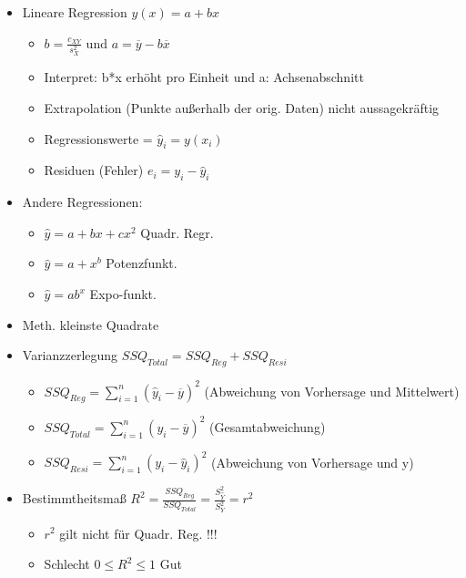 \documentclass[a4paper]{article}
\begin{document}
\begin{landscape}
\begin{multicols}{4}
    \begin{itemize}[noitemsep,nolistsep,leftmargin=*]
        \item Lineare Regression $y(x) = a +bx$
        \begin{itemize}[noitemsep,nolistsep,leftmargin=*]
            \item $b = \frac{c_{XY}}{s_X^2}$ und $a = \overline{y} - b\overline{x}$
            \item Interpret: b*x erhöht pro Einheit und a: Achsenabschnitt
            \item Extrapolation (Punkte außerhalb der orig. Daten) nicht aussagekräftig
            \item Regressionswerte = $\widehat{y}_i = y(x_i)$
            \item Residuen (Fehler) $e_i = y_i - \widehat{y}_i$
        \end{itemize}
        \item Andere Regressionen:
        \begin{itemize}[noitemsep,nolistsep,leftmargin=*]
            \item $\hat{y} =  a+bx+cx^2$ Quadr. Regr.
            \item $\hat{y} =  a+x^b$ Potenzfunkt.
            \item $\hat{y} =  ab^x$ Expo-funkt.
        \end{itemize}
        \item Meth. kleinste Quadrate
        \item Varianzzerlegung $SSQ_{Total} = SSQ_{Reg} + SSQ_{Resi}$
        \begin{itemize}[noitemsep,nolistsep,leftmargin=*]
            \item $SSQ_{Reg} = \sum^n_{i=1} (\hat{y}_i-\overline{y})^2$ (Abweichung von Vorhersage und Mittelwert)
            \item $SSQ_{Total} = \sum^n_{i=1} (y_i-\overline{y})^2$ (Gesamtabweichung)
            \item $SSQ_{Resi} = \sum^n_{i=1} (y_i-\hat{y}_i)^2$ (Abweichung von Vorhersage und y)
        \end{itemize}
        \item Bestimmtheitsmaß $R^2 = \frac{SSQ_{Reg}}{SSQ_{Total}} = \frac{S^2_{\hat{Y}}}{S^2_Y} = r^2$
        \begin{itemize}[noitemsep,nolistsep,leftmargin=*]
            \item $r^2$ gilt nicht für Quadr. Reg. !!!
            \item Schlecht $0  \leq R^2  \leq 1$ Gut 

\end{itemize}
\end{itemize}
\end{multicols}
\end{landscape}
\end{document}
